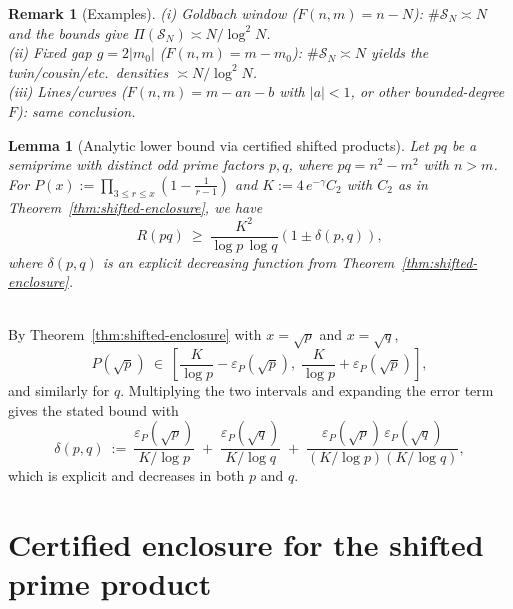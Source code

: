 \documentclass[11pt]{article}
\makeatletter
\theoremstyle{inline}
\newtheorem*{remark}{Remark}
\theoremstyle{break}
\newtheorem{lemma}{Lemma}
\renewenvironment{proof}[1][\proofname]{%
  \par\pushQED{\qed}%
  \normalfont \topsep6\p@\@plus6\p@\relax
  \trivlist
  \item[\hskip\labelsep
        \itshape
    #1\@addpunct{.}]\mbox{}\\  %
}{%
  \popQED\endtrivlist\@endpefalse
}
\theoremstyle{break}
\theoremstyle{break}
\theoremstyle{break}
\theoremstyle{break}
\theoremstyle{inline}
\makeatother
\begin{document}
\begin{remark}[Examples]
(i) \emph{Goldbach window} (\( F(n,m)=n-N \)): \( \#\mathcal{S}_N\asymp N \) and the bounds give \( \Pi(\mathcal{S}_N)\asymp N/\log^2 N \).\\
(ii) \emph{Fixed gap} \( g=2|m_0| \) (\( F(n,m)=m-m_0 \)): \( \#\mathcal{S}_N\asymp N \) yields the twin/cousin/etc.\ densities \( \asymp N/\log^2 N \).\\
(iii) \emph{Lines/curves} (\( F(n,m)=m-an-b \) with \( |a|<1 \), or other bounded-degree \( F \)): same conclusion.
\end{remark}

\begin{lemma}[Analytic lower bound via certified shifted products]
\label{lem:analytic-lower-bound-reduction}
Let \( pq \) be a semiprime with distinct odd prime factors \( p,q \), where \( pq=n^2-m^2 \) with \( n>m \). 
For \( P(x):=\prod_{3\le r\le x}(1-\tfrac{1}{r-1}) \) and \( K:=4\,e^{-\gamma}C_2 \) with \( C_2 \) as in Theorem~\ref{thm:shifted-enclosure}, we have
\begin{equation}
R(pq)\ \ge\ \frac{K^2}{\log p\,\log q}
\left(1 \pm \delta(p,q)\right),
\end{equation}
where \( \delta(p,q) \) is an explicit decreasing function from Theorem~\ref{thm:shifted-enclosure}.
\end{lemma}

\begin{proof}
By Theorem~\ref{thm:shifted-enclosure} with \( x=\sqrt{p} \) and \( x=\sqrt{q} \),
\begin{equation}
P(\sqrt{p})\ \in\ \left[\frac{K}{\log p} - \varepsilon_P(\sqrt{p}),\; \frac{K}{\log p} + \varepsilon_P(\sqrt{p})\right],
\end{equation}
and similarly for \( q \). Multiplying the two intervals and expanding the error term gives the stated bound with
\begin{equation}
\delta(p,q)\ :=\ \frac{\varepsilon_P(\sqrt{p})}{K/\log p} \;+\; \frac{\varepsilon_P(\sqrt{q})}{K/\log q} \;+\; \frac{\varepsilon_P(\sqrt{p})\,\varepsilon_P(\sqrt{q})}{(K/\log p)(K/\log q)},
\end{equation}
which is explicit and decreases in both \( p \) and \( q \).
\end{proof}


\appendix
\section{Certified enclosure for the shifted prime product}
\label{app:shifted-product}
\end{document}
